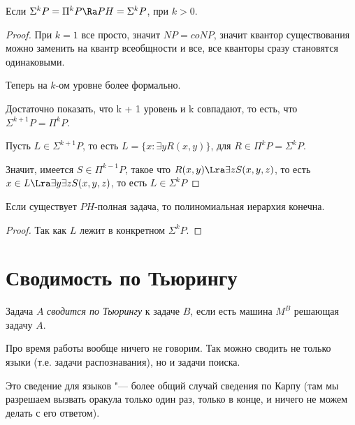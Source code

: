 \begin{theorem}
	Если $\Sigma^k P = \Pi^k P \Ra PH = \Sigma^kP$, при $k > 0$. 
\end{theorem}
\begin{proof}
	При $k = 1$ все просто, значит $NP = coNP$, значит квантор существования можно заменить на квантр всеобщности и все,
	все кванторы сразу становятся одинаковыми.

	Теперь на $k$-ом уровне более формально.
	
	Достаточно показать, что k + 1 уровень и k совпадают, то есть, что $\Sigma^{k + 1}P = \Pi^kP$.

	Пусть $L \in \Sigma^{k + 1}P$, то есть $L = \{x \colon \exists y R(x, y)\}$, для $R \in \Pi^k P = \Sigma^k P$.

	Значит, имеется $S \in \Pi^{k - 1}P$, такое что $R(x, y) \Lra \exists z S(x, y, z)$, то есть
	$x \in L \Lra \exists y \exists z S(x,y, z)$, то есть $L \in \Sigma^{k}P$ 
\end{proof}

\begin{conseq}
	Если существует $PH$-полная задача, то полиномиальная иерархия конечна. 
\end{conseq}

\begin{proof}
	Так как $L$ лежит в конкретном $\Sigma^k P$.
\end{proof}

\section{Сводимость по Тьюрингу}
	\begin{Def}
		Задача $A$ \textit{сводится по Тьюрингу} к задаче $B$, если есть машина $M^B$ решающая задачу $A$.
	\end{Def}
	\begin{Rem}
		Про время работы вообще ничего не говорим.
		Так можно сводить не только языки (т.е. задачи распознавания), но и задачи поиска.
	\end{Rem}
	\begin{Rem}
		Это сведение для языков "--- более общий случай сведения по Карпу (там мы разрешаем вызвать оракула только один раз, только в конце, и ничего не можем делать с его ответом).
	\end{Rem}

